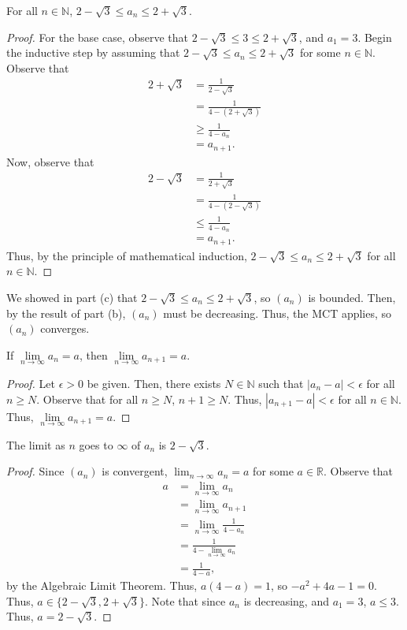 \documentclass[12pt]{article}
\begin{document}
\newpage
{} For all $n \in \mathbb N$, $2 - \sqrt3 \leq a_n \leq 2 + \sqrt3$.
\begin{proof}
    For the base case, observe that $2 - \sqrt3 \leq 3 \leq 2 + \sqrt3$, and $a_1 = 3$. Begin the inductive step by assuming that $2 - \sqrt3 \leq a_n \leq 2 + \sqrt3$ for some $n \in \mathbb N$. Observe that
    \begin{align*}
        2 + \sqrt3 &= \frac{1}{2- \sqrt3} \\
                   &= \frac1{4 - (2 + \sqrt3)} \\
                   &\geq \frac1{4 - a_n} \\
                   &= a_{n+1}.
    \end{align*}
    Now, observe that
    \begin{align*}
        2 - \sqrt3 &= \frac{1}{2 + \sqrt3} \\
                   &= \frac1{4 - (2 - \sqrt3)} \\
                   &\leq \frac1{4 - a_n} \\
                   &= a_{n+1}.
    \end{align*}
    Thus, by the principle of mathematical induction, $2 - \sqrt3 \leq a_n \leq 2 + \sqrt3$ for all $n \in \mathbb N$.
\end{proof}

\medskip
{} We showed in part (c) that $2 - \sqrt3 \leq a_n \leq 2 + \sqrt3$, so $(a_n)$ is bounded. Then, by the result of part (b), $(a_n)$ must be decreasing. Thus, the MCT applies, so $(a_n)$ converges.

\medskip
{} If $\lim\limits_{n\to\infty} a_n = a$, then $\lim\limits_{n \to \infty} a_{n+1} = a$.
\begin{proof}
    Let $\epsilon > 0$ be given. Then, there exists $N \in \mathbb N$ such that $|a_n - a| < \epsilon$ for all $n \geq N$. Observe that for all $n \geq N$, $n+1 \geq N$. Thus, $|a_{n+1} - a| < \epsilon$ for all $n \in \mathbb N$. Thus, $\lim\limits_{n \to \infty} a_{n+1} = a$.
\end{proof}

\newpage
{} The limit as $n$ goes to $\infty$ of $a_n$ is $2 - \sqrt3$.
\begin{proof} Since $(a_n)$ is convergent, $\lim_{n\to\infty} a_n = a$ for some $a \in \mathbb R$. Observe that
\begin{align*}
    a &= \lim_{n\to\infty} a_n \\
                          &= \lim_{n\to\infty} a_{n+1} \\
                          &= \lim_{n\to\infty} \frac1{4-a_n} \\
                          &= \frac1{4 - \lim_{n\to\infty} a_n} \\
                          &= \frac1{4 - a},
\end{align*}
by the Algebraic Limit Theorem. Thus, $a(4-a) = 1$, so $-a^2 + 4a - 1 = 0$. Thus, $a \in \{2 - \sqrt3, 2 + \sqrt3\}$. Note that since $a_n$ is decreasing, and $a_1 = 3$, $a \leq 3$. Thus, $a = 2 - \sqrt3$.
\end{proof}
\end{document}
